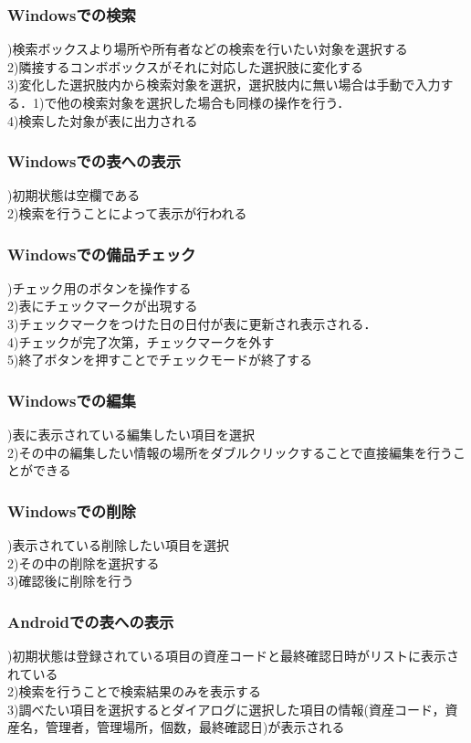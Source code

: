 \documentclass[11pt,a4j]{jarticle}
\begin{document}
\subsubsection{Windowsでの検索}
)検索ボックスより場所や所有者などの検索を行いたい対象を選択する
\\2)隣接するコンボボックスがそれに対応した選択肢に変化する
\\3)変化した選択肢内から検索対象を選択，選択肢内に無い場合は手動で入力する．1)で他の検索対象を選択した場合も同様の操作を行う．
\\4)検索した対象が表に出力される

\subsubsection{Windowsでの表への表示}
)初期状態は空欄である
\\2)検索を行うことによって表示が行われる

\subsubsection{Windowsでの備品チェック}
)チェック用のボタンを操作する
\\2)表にチェックマークが出現する
\\3)チェックマークをつけた日の日付が表に更新され表示される．
\\4)チェックが完了次第，チェックマークを外す
\\5)終了ボタンを押すことでチェックモードが終了する

\subsubsection{Windowsでの編集}
)表に表示されている編集したい項目を選択
\\2)その中の編集したい情報の場所をダブルクリックすることで直接編集を行うことができる

\subsubsection{Windowsでの削除}
)表示されている削除したい項目を選択
\\2)その中の削除を選択する
\\3)確認後に削除を行う

\subsubsection{Androidでの表への表示}
)初期状態は登録されている項目の資産コードと最終確認日時がリストに表示されている
\\2)検索を行うことで検索結果のみを表示する
\\3)調べたい項目を選択するとダイアログに選択した項目の情報(資産コード，資産名，管理者，管理場所，個数，最終確認日)が表示される
\end{document}
